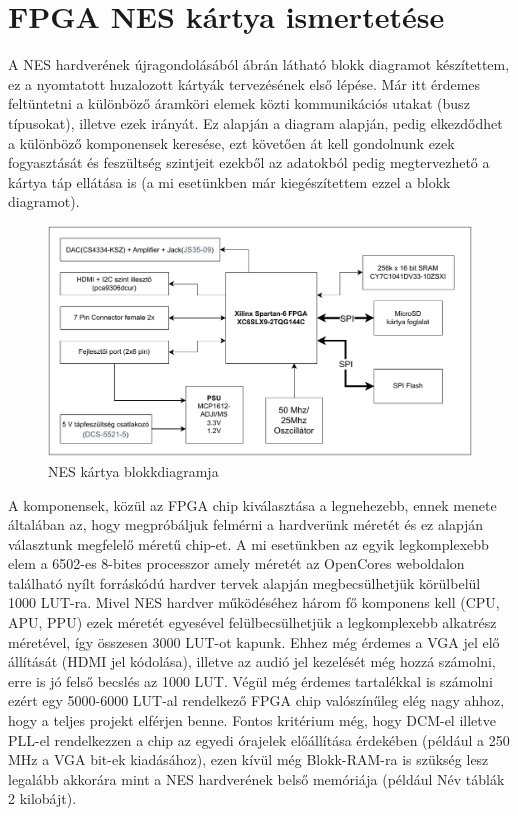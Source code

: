 \chapter{FPGA NES kártya ismertetése}

A NES hardverének újragondolásából  ábrán látható blokk diagramot készítettem, ez a nyomtatott huzalozott kártyák tervezésének első lépése. Már itt érdemes feltüntetni a különböző áramköri elemek közti kommunikációs utakat (busz típusokat), illetve ezek irányát. Ez alapján a diagram alapján, pedig elkezdődhet a különböző komponensek keresése, ezt követően át kell gondolnunk ezek fogyasztását és feszültség szintjeit ezekből az adatokból pedig megtervezhető a kártya táp ellátása is (a mi esetünkben már kiegészítettem ezzel a blokk diagramot). 

\begin{figure}[H]
	\centering
	\includegraphics[width=150mm, keepaspectratio]{figures/NES-board-blockdiagram}
	\caption{NES kártya blokkdiagramja}
	\label{fig:PCB-blockdiagram}
\end{figure}

A komponensek, közül az FPGA chip kiválasztása a legnehezebb, ennek menete általában az, hogy megpróbáljuk felmérni a hardverünk méretét és ez alapján választunk megfelelő méretű chip-et. A mi esetünkben az egyik legkomplexebb elem a 6502-es 8-bites processzor amely méretét az OpenCores weboldalon található nyílt forráskódú hardver tervek alapján megbecsülhetjük körülbelül 1000 LUT-ra. Mivel NES hardver működéséhez három fő komponens kell (CPU, APU, PPU) ezek méretét egyesével felülbecsülhetjük a legkomplexebb alkatrész méretével, így összesen 3000 LUT-ot kapunk. Ehhez még érdemes a VGA jel elő állítását (HDMI jel kódolása), illetve az audió jel kezelését még hozzá számolni, erre is jó felső becslés az 1000 LUT. Végül még érdemes tartalékkal is számolni ezért egy 5000-6000 LUT-al rendelkező FPGA chip valószínűleg elég nagy ahhoz, hogy a teljes projekt elférjen benne. Fontos kritérium még, hogy DCM-el illetve PLL-el rendelkezzen a chip az egyedi órajelek előállítása érdekében (például a 250 MHz a VGA bit-ek kiadásához), ezen kívül még Blokk-RAM-ra is szükség lesz legalább akkorára mint a NES hardverének belső memóriája (például Név táblák 2 kilobájt).  

